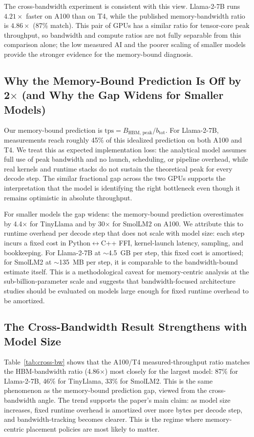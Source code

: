 \documentclass[conference]{IEEEtran}
\begin{document}
The cross-bandwidth experiment is consistent with this view. Llama-2-7B runs $4.21\times$ faster on A100 than on T4, while the published memory-bandwidth ratio is $4.86\times$ (87\% match). This pair of GPUs has a similar ratio for tensor-core peak throughput, so bandwidth and compute ratios are not fully separable from this comparison alone; the low measured AI and the poorer scaling of smaller models provide the stronger evidence for the memory-bound diagnosis.

\subsection{Why the Memory-Bound Prediction Is Off by 2$\times$ (and Why the Gap Widens for Smaller Models)}

Our memory-bound prediction is $\text{tps} = B_{\text{HBM, peak}} / b_{\text{tot}}$. For Llama-2-7B, measurements reach roughly 45\% of this idealized prediction on both A100 and T4. We treat this as expected implementation loss: the analytical model assumes full use of peak bandwidth and no launch, scheduling, or pipeline overhead, while real kernels and runtime stacks do not sustain the theoretical peak for every decode step. The similar fractional gap across the two GPUs supports the interpretation that the model is identifying the right bottleneck even though it remains optimistic in absolute throughput.

For smaller models the gap widens: the memory-bound prediction overestimates by 4.4$\times$ for TinyLlama and by 30$\times$ for SmolLM2 on A100. We attribute this to runtime overhead per decode step that does not scale with model size: each step incurs a fixed cost in Python$\leftrightarrow$C++ FFI, kernel-launch latency, sampling, and bookkeeping. For Llama-2-7B at $\sim$4.5~GB per step, this fixed cost is amortised; for SmolLM2 at $\sim$135~MB per step, it is comparable to the bandwidth-bound estimate itself. This is a methodological caveat for memory-centric analysis at the sub-billion-parameter scale and suggests that bandwidth-focused architecture studies should be evaluated on models large enough for fixed runtime overhead to be amortized.

\subsection{The Cross-Bandwidth Result Strengthens with Model Size}

Table~\ref{tab:cross-bw} shows that the A100/T4 measured-throughput ratio matches the HBM-bandwidth ratio (4.86$\times$) most closely for the largest model: 87\% for Llama-2-7B, 46\% for TinyLlama, 33\% for SmolLM2. This is the same phenomenon as the memory-bound prediction gap, viewed from the cross-bandwidth angle. The trend supports the paper's main claim: as model size increases, fixed runtime overhead is amortized over more bytes per decode step, and bandwidth-tracking becomes clearer. This is the regime where memory-centric placement policies are most likely to matter.
\end{document}
